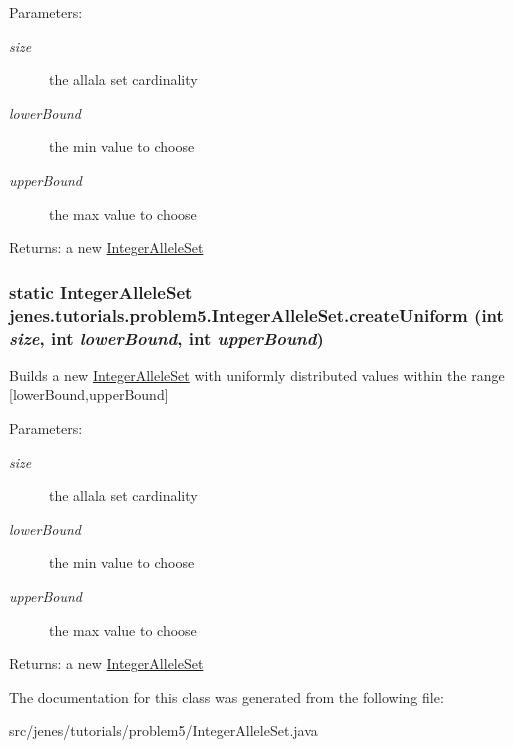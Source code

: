 \begin{Desc}
\item[Parameters:]
\begin{description}
\item[{\em size}]the allala set cardinality \item[{\em lowerBound}]the min value to choose \item[{\em upperBound}]the max value to choose \end{description}
\end{Desc}
\begin{Desc}
\item[Returns:]a new \hyperlink{classjenes_1_1tutorials_1_1problem5_1_1_integer_allele_set}{IntegerAlleleSet} \end{Desc}
\hypertarget{classjenes_1_1tutorials_1_1problem5_1_1_integer_allele_set_20d2ef7f0a59edafa82345db48fcefa3}{
\subsubsection[createUniform]{\setlength{\rightskip}{0pt plus 5cm}static {\bf IntegerAlleleSet} jenes.tutorials.problem5.IntegerAlleleSet.createUniform (int {\em size}, \/  int {\em lowerBound}, \/  int {\em upperBound})}}
\label{classjenes_1_1tutorials_1_1problem5_1_1_integer_allele_set_20d2ef7f0a59edafa82345db48fcefa3}


Builds a new \hyperlink{classjenes_1_1tutorials_1_1problem5_1_1_integer_allele_set}{IntegerAlleleSet} with uniformly distributed values within the range \mbox{[}lowerBound,upperBound\mbox{]} 

\begin{Desc}
\item[Parameters:]
\begin{description}
\item[{\em size}]the allala set cardinality \item[{\em lowerBound}]the min value to choose \item[{\em upperBound}]the max value to choose \end{description}
\end{Desc}
\begin{Desc}
\item[Returns:]a new \hyperlink{classjenes_1_1tutorials_1_1problem5_1_1_integer_allele_set}{IntegerAlleleSet} \end{Desc}


The documentation for this class was generated from the following file:\begin{CompactItemize}
\item 
src/jenes/tutorials/problem5/IntegerAlleleSet.java\end{CompactItemize}
